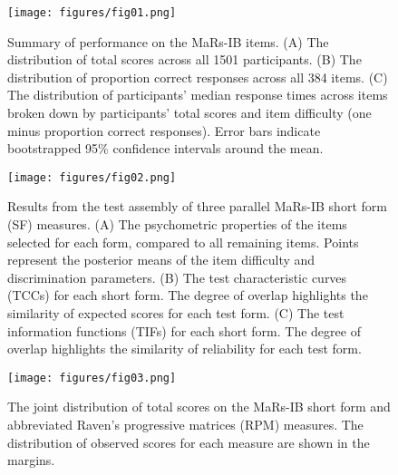 \documentclass[a4paper,man,natbib]{apa6}
\begin{document}
\begin{figure}
\centering
\texttt{[image: figures/fig01.png]}
\caption{\label{fig:fig01}Summary of performance on the MaRs-IB items. (A) The distribution of total scores across all 1501 participants. (B) The distribution of proportion correct responses across all 384 items. (C) The distribution of participants' median response times across items broken down by participants' total scores and item difficulty (one minus proportion correct responses). Error bars indicate bootstrapped 95\% confidence intervals around the mean.}
\end{figure}
 
\begin{figure}
\centering
\texttt{[image: figures/fig02.png]}
\caption{\label{fig:fig02}Results from the test assembly of three parallel MaRs-IB short form (SF) measures. (A) The psychometric properties of the items selected for each form, compared to all remaining items. Points represent the posterior means of the item difficulty and discrimination  parameters. (B) The test characteristic curves (TCCs) for each short form. The degree of overlap highlights the similarity of expected scores for each test form. (C) The test information functions (TIFs) for each short form. The degree of overlap highlights the similarity of reliability for each test form.}
\end{figure}

\begin{figure}
\centering
\texttt{[image: figures/fig03.png]}
\caption{\label{fig:fig03}The joint distribution of total scores on the MaRs-IB short form and abbreviated Raven's progressive matrices (RPM) measures. The distribution of observed scores for each measure are shown in the margins.}
\end{figure}
\end{document}

